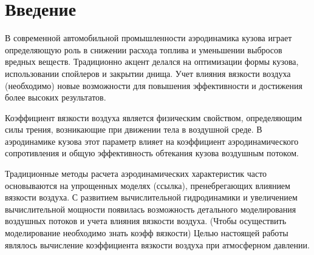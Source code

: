 \section{Введение}

В современной автомобильной промышленности аэродинамика кузова играет определяющую роль в снижении расхода топлива и уменьшении выбросов вредных веществ. Традиционно акцент делался на оптимизации формы кузова, использовании спойлеров и закрытии днища. Учет влияния вязкости воздуха (необходимо) новые возможности для повышения эффективности и достижения более высоких результатов.

Коэффициент вязкости воздуха является физическим свойством, определяющим силы трения, возникающие при движении тела в воздушной среде. В аэродинамике кузова этот параметр влияет на коэффициент аэродинамического сопротивления и общую эффективность обтекания кузова воздушным потоком.

Традиционные методы расчета аэродинамических характеристик часто основываются на упрощенных моделях (ссылка), пренебрегающих влиянием вязкости воздуха. С развитием вычислительной гидродинамики и увеличением вычислительной мощности появилась возможность детального моделирования воздушных потоков и учета влияния вязкости воздуха.
(Чтобы осуществить моделирование необходимо знать коэфф вязкости)
Целью настоящей работы являлось вычисление коэффициента вязкости воздуха при атмосферном давлении.